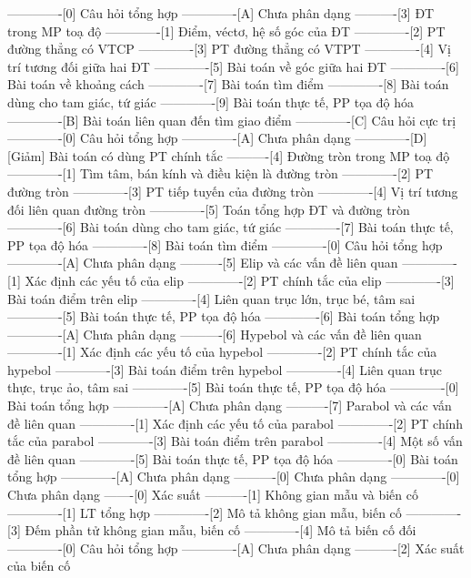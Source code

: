 -------------[0] Câu hỏi tổng hợp
-------------[A] Chưa phân dạng
----------[3] ĐT trong MP toạ độ
-------------[1] Điểm, véctơ, hệ số góc của ĐT
-------------[2] PT đường thẳng có VTCP
-------------[3] PT đường thẳng có VTPT
-------------[4] Vị trí tương đối giữa hai ĐT
-------------[5] Bài toán về góc giữa hai ĐT
-------------[6] Bài toán về khoảng cách
-------------[7] Bài toán tìm điểm
-------------[8] Bài toán dùng cho tam giác, tứ giác
-------------[9] Bài toán thực tế, PP tọa độ hóa
-------------[B] Bài toán liên quan đến tìm giao điểm
-------------[C] Câu hỏi cực trị
-------------[0] Câu hỏi tổng hợp
-------------[A] Chưa phân dạng
-------------[D] [Giảm] Bài toán có dùng PT chính tắc
----------[4] Đường tròn trong MP toạ độ
-------------[1] Tìm tâm, bán kính và điều kiện là đường tròn
-------------[2] PT đường tròn
-------------[3] PT tiếp tuyến của đường tròn
-------------[4] Vị trí tương đối liên quan đường tròn
-------------[5] Toán tổng hợp ĐT và đường tròn
-------------[6] Bài toán dùng cho tam giác, tứ giác
-------------[7] Bài toán thực tế, PP tọa độ hóa
-------------[8] Bài toán tìm điểm
-------------[0] Câu hỏi tổng hợp
-------------[A] Chưa phân dạng
----------[5] Elip và các vấn đề liên quan
-------------[1] Xác định các yếu tố của elip
-------------[2] PT chính tắc của elip
-------------[3] Bài toán điểm trên elip
-------------[4] Liên quan trục lớn, trục bé, tâm sai
-------------[5] Bài toán thực tế, PP tọa độ hóa
-------------[6] Bài toán tổng hợp
-------------[A] Chưa phân dạng
----------[6] Hypebol và các vấn đề liên quan
-------------[1] Xác định các yếu tố của hypebol
-------------[2] PT chính tắc của hypebol
-------------[3] Bài toán điểm trên hypebol
-------------[4] Liên quan trục thực, trục ảo, tâm sai
-------------[5] Bài toán thực tế, PP tọa độ hóa
-------------[0] Bài toán tổng hợp
-------------[A] Chưa phân dạng
----------[7] Parabol và các vấn đề liên quan
-------------[1] Xác định các yếu tố của parabol
-------------[2] PT chính tắc của parabol
-------------[3] Bài toán điểm trên parabol
-------------[4] Một số vấn đề liên quan
-------------[5] Bài toán thực tế, PP tọa độ hóa
-------------[0] Bài toán tổng hợp
-------------[A] Chưa phân dạng
----------[0] Chưa phân dạng
-------------[0] Chưa phân dạng
-------[0] Xác suất
----------[1] Không gian mẫu và biến cố
-------------[1] LT tổng hợp
-------------[2] Mô tả không gian mẫu, biến cố
-------------[3] Đếm phần tử không gian mẫu, biến cố
-------------[4] Mô tả biến cố đối
-------------[0] Câu hỏi tổng hợp
-------------[A] Chưa phân dạng
----------[2] Xác suất của biến cố
